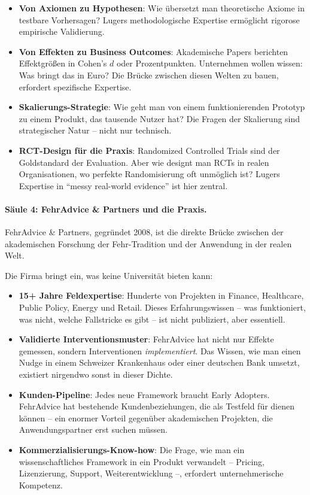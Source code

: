\begin{itemize}
    \item \textbf{Von Axiomen zu Hypothesen}: Wie übersetzt man theoretische Axiome in testbare Vorhersagen? Lugers methodologische Expertise ermöglicht rigorose empirische Validierung.

    \item \textbf{Von Effekten zu Business Outcomes}: Akademische Papers berichten Effektgrößen in Cohen's $d$ oder Prozentpunkten. Unternehmen wollen wissen: Was bringt das in Euro? Die Brücke zwischen diesen Welten zu bauen, erfordert spezifische Expertise.

    \item \textbf{Skalierungs-Strategie}: Wie geht man von einem funktionierenden Prototyp zu einem Produkt, das tausende Nutzer hat? Die Fragen der Skalierung sind strategischer Natur -- nicht nur technisch.

    \item \textbf{RCT-Design für die Praxis}: Randomized Controlled Trials sind der Goldstandard der Evaluation. Aber wie designt man RCTs in realen Organisationen, wo perfekte Randomisierung oft unmöglich ist? Lugers Expertise in ``messy real-world evidence'' ist hier zentral.
\end{itemize}

\paragraph{Säule 4: FehrAdvice \& Partners und die Praxis.}

FehrAdvice \& Partners, gegründet 2008, ist die direkte Brücke zwischen der akademischen Forschung der Fehr-Tradition und der Anwendung in der realen Welt.

Die Firma bringt ein, was keine Universität bieten kann:

\begin{itemize}
    \item \textbf{15+ Jahre Feldexpertise}: Hunderte von Projekten in Finance, Healthcare, Public Policy, Energy und Retail. Dieses Erfahrungswissen -- was funktioniert, was nicht, welche Fallstricke es gibt -- ist nicht publiziert, aber essentiell.

    \item \textbf{Validierte Interventionsmuster}: FehrAdvice hat nicht nur Effekte gemessen, sondern Interventionen \textit{implementiert}. Das Wissen, wie man einen Nudge in einem Schweizer Krankenhaus oder einer deutschen Bank umsetzt, existiert nirgendwo sonst in dieser Dichte.

    \item \textbf{Kunden-Pipeline}: Jedes neue Framework braucht Early Adopters. FehrAdvice hat bestehende Kundenbeziehungen, die als Testfeld für \BEATRIX{} dienen können -- ein enormer Vorteil gegenüber akademischen Projekten, die Anwendungspartner erst suchen müssen.

    \item \textbf{Kommerzialisierungs-Know-how}: Die Frage, wie man ein wissenschaftliches Framework in ein Produkt verwandelt -- Pricing, Lizenzierung, Support, Weiterentwicklung --, erfordert unternehmerische Kompetenz.
\end{itemize}

